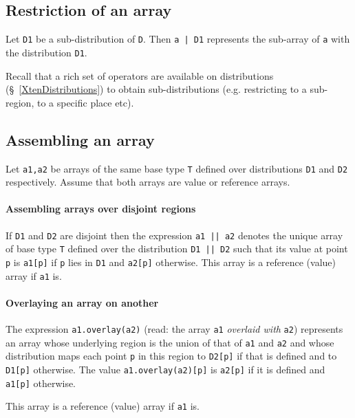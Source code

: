 \subsection{Restriction of an array}

Let {\tt D1} be a sub-distribution of {\tt D}. Then {\tt a | D1}
represents the sub-array of {\tt a} with the distribution {\tt D1}.

Recall that a rich set of operators are available on distributions
(\S~\ref{XtenDistributions}) to obtain sub-distributions
(e.g. restricting to a sub-region, to a specific place etc).

\subsection{Assembling an array}
Let {\tt a1,a2} be arrays of the same base type {\tt T} defined over
distributions {\tt D1} and {\tt D2} respectively. Assume that both
arrays are value or reference arrays. 
\paragraph{Assembling arrays over disjoint regions}

If {\tt D1} and {\tt D2} are disjoint then the expression {\tt a1 ||
a2} denotes the unique array of base type {\tt T} defined over the
distribution {\tt D1 || D2} such that its value at point {\tt p} is
{\tt a1[p]} if {\tt p} lies in {\tt D1} and {\tt a2[p]}
otherwise. This array is a reference (value) array if {\tt a1} is.

\paragraph{Overlaying an array on another}
The expression
{\tt a1.overlay(a2)} (read: the array {\tt a1} {\em overlaid with} {\tt a2})
represents an array whose underlying region is the union of that of
{\tt a1} and {\tt a2} and whose distribution maps each point {\tt p}
in this region to {\tt D2[p]} if that is defined and to {\tt D1[p]}
otherwise. The value {\tt a1.overlay(a2)[p]} is {\tt a2[p]} if it is defined and {\tt a1[p]} otherwise.

This array is a reference (value) array if {\tt a1} is.




